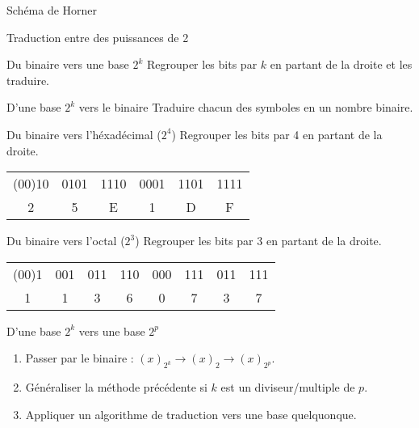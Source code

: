 \begin{frame}{Schéma de Horner}
\end{frame}


\begin{frame}{Traduction entre des puissances de 2}
  \begin{block}{Du binaire vers une base $2^k$}
    Regrouper les bits par $k$ en partant de la droite et les traduire.
  \end{block}
   
   \begin{block}{D'une base $2^k$ vers le binaire}
     Traduire chacun des symboles en un nombre binaire.
   \end{block}

  \begin{exampleblock}{Du binaire vers l'héxadécimal ($2^4$)}
    Regrouper les bits par 4 en partant de la droite.
    \begin{tabular}{*{6}{c}}
      (00)10 & 0101 & 1110 & 0001 & 1101 & 1111 \\
      2      & 5    & E    & 1    & D    & F
    \end{tabular}
  \end{exampleblock}

  \begin{exampleblock}{Du binaire vers l'octal ($2^3$)}
    Regrouper les bits par 3 en partant de la droite.
    \begin{tabular}{*{8}{c}}
     (00)1 & 001 & 011 & 110 & 000 & 111 & 011 & 111 \\
      1    & 1   & 3   & 6   & 0   & 7   & 3   & 7
    \end{tabular}
  \end{exampleblock}

  
   \begin{block}{D'une base $2^k$ vers une base $2^p$}
     \begin{enumerate}
     \item<alert@1> Passer par le binaire : $(x)_{2^k} \rightarrow (x)_2 \rightarrow (x)_{2^p}$.
     \item Généraliser la méthode précédente si $k$ est un diviseur/multiple de $p$.
     \item Appliquer un algorithme de traduction vers une base quelquonque.
     \end{enumerate}
   \end{block}

 \end{frame}



